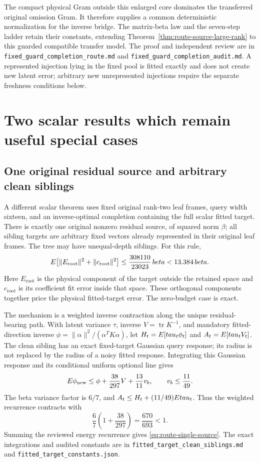 \documentclass[11pt,oneside,openany,a4paper]{report}
\numberwithin{equation}{chapter}
\theoremstyle{definition}
\theoremstyle{remark}
\newcommand{\sourcefile}[1]{{\small\nolinkurl{#1}}}
\DeclareMathOperator{\tr}{tr}\DeclareMathOperator{\rank}{rank}
\begin{document}
The compact physical Gram outside this enlarged core dominates the
transferred original omission Gram.  It therefore supplies a common
deterministic normalization for the inverse bridge.  The matrix-beta
law and the seven-step ladder retain their constants, extending
Theorem~\ref{thm:route-source-large-rank} to this guarded compatible
transfer model.  The proof and independent review are in
\sourcefile{fixed_guard_completion_route.md} and
\sourcefile{fixed_guard_completion_audit.md}.  A represented injection
lying in the fixed pool is fitted exactly and does not create new
latent error; arbitrary new unrepresented injections require the
separate freshness conditions below.

\section{Two scalar results which remain useful special cases}

\subsection{One original residual source and arbitrary clean siblings}

A different scalar theorem uses fixed original rank-two leaf frames,
query width sixteen, and an inverse-optimal completion containing the
full scalar fitted target.  There is exactly one original nonzero
residual source, of squared norm $\beta$; all sibling targets are
arbitrary fixed vectors already represented in their original leaf
frames.  The tree may have unequal-depth siblings.  For this rule,
\begin{equation}
 E\bigl[\lVert E_{\mathrm{root}}\rVert^2
                 +\lVert c_{\mathrm{root}}\rVert^2\bigr]
 \leq\frac{308110}{23023}\,beta<13.384\,beta.
 \label{eq:route-single-source}
\end{equation}
Here $E_{\mathrm{root}}$ is the physical component of the target outside
the retained space and $c_{\mathrm{root}}$ is its coefficient fit error
inside that space.  These orthogonal components together price the
physical fitted-target error.  The zero-budget case is exact.

The mechanism is a weighted inverse contraction along the unique
residual-bearing path.  With latent variance $\tau$, inverse
$V=\tr K^{-1}$, and mandatory fitted-direction inverse
$\phi=\lVert\alpha\rVert^2/(\alpha^TK\alpha)$, let
$H_t=E[tau_t\phi_t]$ and $A_t=E[tau_tV_t]$.
The clean sibling has an exact fixed-target Gaussian query response;
its radius is not replaced by the radius of a noisy fitted response.
Integrating this Gaussian response and its conditional uniform optional
line gives
\[
 E\phi_{\mathrm{new}}\leq\phi+\frac{38}{297}V
                         +\frac{13}{11}v_b,
 \qquad v_b\leq\frac{11}{49}.
\]
The beta variance factor is $6/7$, and
$A_t\leq H_t+(11/49)Etau_t$.
Thus the weighted recurrence contracts with
\[
 \frac67\left(1+\frac{38}{297}\right)
 =\frac{670}{693}<1.
\]
Summing the reviewed energy recurrence gives
\eqref{eq:route-single-source}.  The exact integrations and audited
constants are in \sourcefile{fitted_target_clean_siblings.md} and
\sourcefile{fitted_target_constants.json}.
\end{document}
